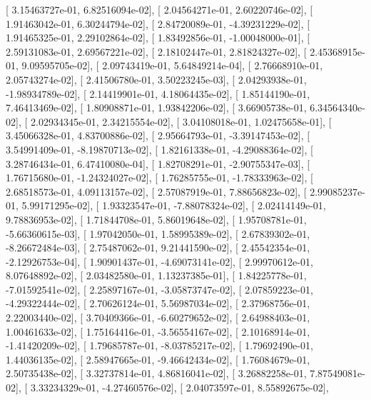 \documentclass{article}
\begin{document}
       [  3.15463727e-01,   6.82516094e-02],
       [  2.04564271e-01,   2.60220746e-02],
       [  1.91463042e-01,   6.30244794e-02],
       [  2.84720089e-01,  -4.39231229e-02],
       [  1.91465325e-01,   2.29102864e-02],
       [  1.83492856e-01,  -1.00048000e-01],
       [  2.59131083e-01,   2.69567221e-02],
       [  2.18102447e-01,   2.81824327e-02],
       [  2.45368915e-01,   9.09595705e-02],
       [  2.09743419e-01,   5.64849214e-04],
       [  2.76668910e-01,   2.05743274e-02],
       [  2.41506780e-01,   3.50223245e-03],
       [  2.04293938e-01,  -1.98934789e-02],
       [  2.14419901e-01,   4.18064435e-02],
       [  1.85144190e-01,   7.46413469e-02],
       [  1.80908871e-01,   1.93842206e-02],
       [  3.66905738e-01,   6.34564340e-02],
       [  2.02934345e-01,   2.34215554e-02],
       [  3.04108018e-01,   1.02475658e-01],
       [  3.45066328e-01,   4.83700886e-02],
       [  2.95664793e-01,  -3.39147453e-02],
       [  3.54991409e-01,  -8.19870713e-02],
       [  1.82161338e-01,  -4.29088364e-02],
       [  3.28746434e-01,   6.47410080e-04],
       [  1.82708291e-01,  -2.90755347e-03],
       [  1.76715680e-01,  -1.24324027e-02],
       [  1.76285755e-01,  -1.78333963e-02],
       [  2.68518573e-01,   4.09113157e-02],
       [  2.57087919e-01,   7.88656823e-02],
       [  2.99085237e-01,   5.99171295e-02],
       [  1.93323547e-01,  -7.88078324e-02],
       [  2.02414149e-01,   9.78836953e-02],
       [  1.71844708e-01,   5.86019648e-02],
       [  1.95708781e-01,  -5.66360615e-03],
       [  1.97042050e-01,   1.58995389e-02],
       [  2.67839302e-01,  -8.26672484e-03],
       [  2.75487062e-01,   9.21441590e-02],
       [  2.45542354e-01,  -2.12926753e-04],
       [  1.90901437e-01,  -4.69073141e-02],
       [  2.99970612e-01,   8.07648892e-02],
       [  2.03482580e-01,   1.13237385e-01],
       [  1.84225778e-01,  -7.01592541e-02],
       [  2.25897167e-01,  -3.05873747e-02],
       [  2.07859223e-01,  -4.29322444e-02],
       [  2.70626124e-01,   5.56987034e-02],
       [  2.37968756e-01,   2.22003440e-02],
       [  3.70409366e-01,  -6.60279652e-02],
       [  2.64988403e-01,   1.00461633e-02],
       [  1.75164416e-01,  -3.56554167e-02],
       [  2.10168914e-01,  -1.41420209e-02],
       [  1.79685787e-01,  -8.03785217e-02],
       [  1.79692490e-01,   1.44036135e-02],
       [  2.58947665e-01,  -9.46642434e-02],
       [  1.76084679e-01,   2.50735438e-02],
       [  3.32737814e-01,   4.86816041e-02],
       [  3.26882258e-01,   7.87549081e-02],
       [  3.33234329e-01,  -4.27460576e-02],
       [  2.04073597e-01,   8.55892675e-02],
\end{document}
